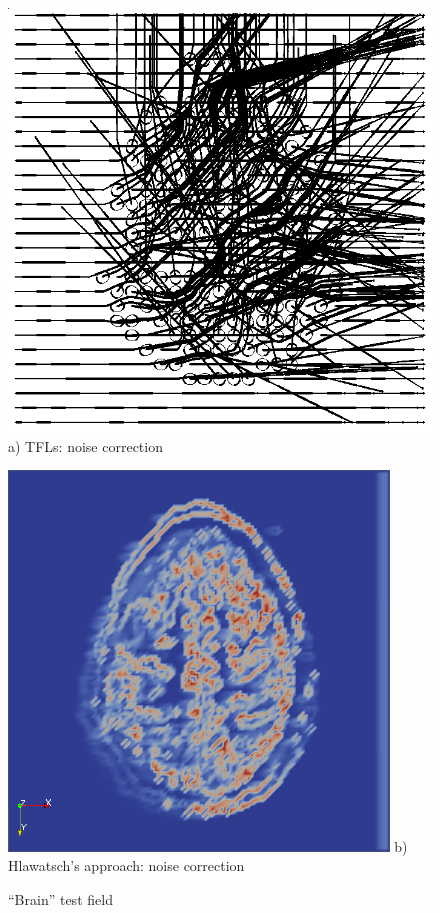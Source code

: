 \documentclass{scrartcl}
\begin{document}
\begin{figure}[!t]
\centering
  \begin{minipage}[t]{0.4\textwidth}
   \centering
  \includegraphics[height=0.9\textwidth]{img_new/brain-TFL.png}
	a) TFLs: noise correction
    \label{a)}
  \end{minipage}
  \begin{minipage}[t]{0.4\textwidth}
   \centering
    \includegraphics[width=0.9\textwidth]{img/brain_ftle_surf_noisereduction.PNG}
	b) Hlawatsch's approach: noise correction
    \label{b)}
  \end{minipage}
\caption{\enquote{Brain} test field}
\label{brain_ftle_noise}
\end{figure}
\end{document}
